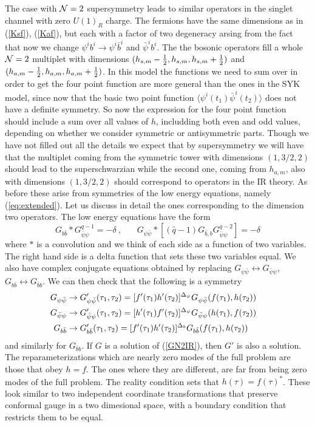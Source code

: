 \documentclass[aps,pre,preprint,onecolumn,citeautoscript,superscriptaddress,nofootinbib,eqsecnum]{revtex4-1}
\def\bea{\begin{eqnarray}}
\def\eea{\end{eqnarray}}
\def\nref#1{(\ref{#1})}
\def\be{\begin{equation}}
\def\ee{\end{equation}}
\def\half{{1 \over 2 }}
\begin{document}
 
The case with ${\cal N}=2$ supersymmetry leads to similar operators in the singlet channel with zero $U(1)_R$ charge. 
The fermions have the same dimensions as in \nref{Ksf}, \nref{Kaf}, but each with a factor of two degeneracy arsing from the fact that now we 
change $\psi^i b^i \to \psi^i \bar b^i$ and $\bar \psi^i b^i $. The  the bosonic operators fill a whole ${\cal N}=2$ multiplet with dimensions
$(h_{s,m} - \half, h_{s,m}, h_{s,m} + \half)$ and $(h_{a,m} - \half, h_{a,m}, h_{a,m} + \half) $. In this model the functions we need to sum over in order to get the
four point function are more general than the ones in the SYK model, since now that the basic two point function $\langle \psi^i(t_1) \bar \psi^i(t_2) \rangle$ 
does not have a definite symmetry. So now the expression for the four point function should include a sum over all values of $h$, includding both even and odd values, 
depending on whether we consider symmetric or antisymmetric parts. Though we have not filled out all the details we expect that by supersymmetry we will have
that the multiplet coming from the symmetric tower with dimensions $(1,3/2,2)$ should lead to the superschwarzian while the second one, coming from $h_{a,m}$, 
also with dimensions $(1,3/2,2)$ should correspond to operators in the IR theory. As before these arise from symmetries of the low energy equations, namely (\ref{eq:extended}). 
Let us discuss in detail the ones corresponding to the dimension two operators. 
The low energy equations have the form 
\be \label{GN2IR}
G_{b \bar b} *   G_{\bar \psi \psi }^{\hat q -1} = -\delta  ~,~~~~~~~~ G_{\psi \bar \psi} * [ (\hat q-1  ) G_{\bar b , b } G_{\bar \psi \psi }^{\hat q -2} ] = -\delta 
\ee
where $*$ is a convolution and we think of each side as a function of two variables. The right hand side is a delta function that sets these two variables equal.  
We also have   complex conjugate equations obtained by replacing $G_{\psi \bar \psi} \leftrightarrow G_{\bar \psi \psi } $, $G_{b \bar b} \leftrightarrow G_{\bar b b } $. 
We can then check that the following is a symmetry 
\bea
G_{\psi \bar \psi } & \to  G'_{\psi \bar \psi } (\tau_1 , \tau_2) = [f'(\tau_1) h'(\tau_2)]^{\Delta_\psi } G_{\psi \bar \psi } (f(\tau_1) , h(\tau_2))
\cr
G_{\bar \psi   \psi } & \to  G'_{\bar \psi   \psi } (\tau_1 , \tau_2) = [h'(\tau_1) f'(\tau_2)]^{\Delta_\psi } G_{\bar \psi   \psi } (h(\tau_1) , f(\tau_2))
\cr
G_{b \bar b } & \to  G'_{b\bar b } (\tau_1 , \tau_2) = [f'(\tau_1) h'(\tau_2)]^{\Delta_b } G_{b\bar b } (f(\tau_1) , h(\tau_2))
\eea
and similarly for $G_{\bar b b}$. If $G$ is a solution of \nref{GN2IR}, then $G'$ is also a solution.  
The  reparameterizations which are nearly zero modes of the full problem are those that obey $h = f$. The ones where they are different, are far from being zero modes of 
the full problem. The reality condition sets  that $h(\tau) = f(\tau)^*$. These look similar to two independent coordinate transformations that preserve 
conformal gauge in a two dimesional space,  with a  boundary condition that restricts them to be equal. 
\end{document}
